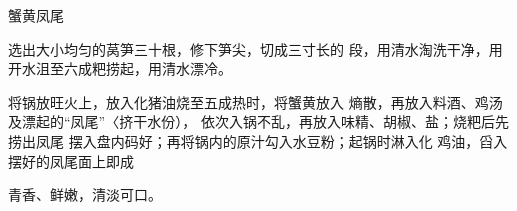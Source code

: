 \begin{recipe}{蟹黄凤尾}

\ingredients


\cooking

\step 选出大小均匀的莴笋三十根，修下笋尖，切成三寸长的 段，用清水淘洗干净，用开水沮至六成粑捞起，用清水漂冷。

\step 将锅放旺火上，放入化猪油烧至五成热时，将蟹黄放入 熵散，再放入料酒、鸡汤及漂起的“凤尾”〈挤干水份）， 依次入锅不乱，再放入味精、胡椒、盐；烧粑后先捞出凤尾 摆入盘内码好；再将锅内的原汁勾入水豆粉；起锅时淋入化 鸡油，舀入摆好的凤尾面上即成

\notes

青香、鲜嫩，清淡可口。

\end{recipe}

